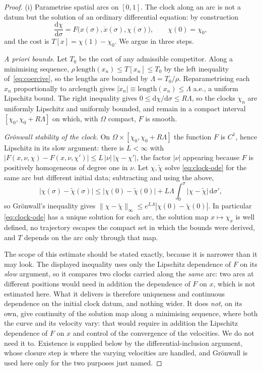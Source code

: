 \documentclass[12pt]{iopart}
\newcommand{\dd}{\mathrm{d}}
\theoremstyle{plain}
\theoremstyle{definition}
\theoremstyle{plain}
\theoremstyle{remark}
\begin{document}
\begin{proof}
(i) Parametrise spatial arcs on $[0,1]$. The clock along an arc is not a datum but the
solution of an ordinary differential equation: by construction
\begin{equation}
   \frac{\dd\chi}{\dd\sigma}=F\big(x(\sigma),\dot x(\sigma),\chi(\sigma)\big),
   \qquad \chi(0)=\chi_0 ,
   \label{eq:clock-ode}
\end{equation}
and the cost is $T[x]=\chi(1)-\chi_0$. We argue in three steps.

\emph{A priori bounds.} Let $T_0$ be the cost of any admissible competitor. Along a
minimising sequence, $\rho\,\mathrm{length}(x_n)\le T[x_n]\le T_0$ by the left inequality
of~\eqref{eq:coercive}, so the lengths are bounded by $\Lambda=T_0/\rho$. Reparametrising
each $x_n$ proportionally to arclength gives $|\dot x_n|\equiv\mathrm{length}(x_n)\le\Lambda$
a.e., a uniform Lipschitz bound. The right inequality gives
$0\le\dd\chi/\dd\sigma\le R\Lambda$, so the clocks $\chi_n$ are uniformly Lipschitz and
uniformly bounded, and remain in a compact interval $[\chi_0,\chi_0+R\Lambda]$ on which,
with $\Omega$ compact, $F$ is smooth.

\emph{Gr\"onwall stability of the clock.} On $\Omega\times[\chi_0,\chi_0+R\Lambda]$ the
function $F$ is $C^1$, hence Lipschitz in its slow argument: there is $L<\infty$ with
$|F(x,\nu,\chi)-F(x,\nu,\chi')|\le L\,|\nu|\,|\chi-\chi'|$, the factor $|\nu|$ appearing
because $F$ is positively homogeneous of degree one in $\nu$. Let $\chi,\tilde\chi$ solve
\eqref{eq:clock-ode} for the same arc but different initial data; subtracting and
using the above,
\[
   \big|\chi(\sigma)-\tilde\chi(\sigma)\big|
   \le\big|\chi(0)-\tilde\chi(0)\big|
   +L\Lambda\!\int_0^{\sigma}\!\big|\chi-\tilde\chi\big|\,\dd\sigma' ,
\]
so Gr\"onwall's inequality gives
$\|\chi-\tilde\chi\|_\infty\le e^{L\Lambda}|\chi(0)-\tilde\chi(0)|$. In particular
\eqref{eq:clock-ode} has a unique solution for each arc, the solution map
$x\mapsto\chi_x$ is well defined, no trajectory escapes the compact set in which the
bounds were derived, and $T$ depends on the arc only through that map.

The scope of this estimate should be stated exactly, because it is narrower than it
may look. The displayed inequality uses only the Lipschitz dependence of $F$ on its
\emph{slow} argument, so it compares two clocks carried along the \emph{same} arc:
two arcs at different positions would need in addition the dependence of $F$ on $x$,
which is not estimated here. What it delivers is therefore uniqueness and continuous
dependence on the initial clock datum, and nothing wider. It does \emph{not}, on its own, give continuity of the solution
map along a minimising sequence, where both the curve and its velocity vary: that
would require in addition the Lipschitz dependence of $F$ on $x$ and control of the
convergence of the velocities. We do not need it to. Existence is supplied below by
the differential-inclusion argument, whose closure step is where the varying
velocities are handled, and Gr\"onwall is used here only for the two purposes just
named.


\end{proof}
\end{document}

